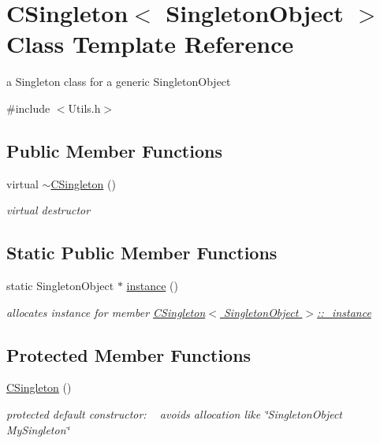 \hypertarget{classCSingleton}{}\section{C\+Singleton$<$ Singleton\+Object $>$ Class Template Reference}
\label{classCSingleton}


a Singleton class for a generic Singleton\+Object  




{\ttfamily \#include $<$Utils.\+h$>$}

\subsection*{Public Member Functions}
\begin{DoxyCompactItemize}
\item 
virtual \hyperlink{classCSingleton_ad790e6c170b3e2da7fbb10873eeb882e}{$\sim$\+C\+Singleton} ()
\begin{DoxyCompactList}\small\item\em virtual destructor \end{DoxyCompactList}\end{DoxyCompactItemize}
\subsection*{Static Public Member Functions}
\begin{DoxyCompactItemize}
\item 
static Singleton\+Object $\ast$ \hyperlink{classCSingleton_a58f5ac3aaaea8079a373350594726bdf}{instance} ()
\begin{DoxyCompactList}\small\item\em allocates instance for member \hyperlink{classCSingleton_a690e0816be5d469e60d074cf8c5d139c}{C\+Singleton$<$ Singleton\+Object $>$\+::\+\_\+instance} \end{DoxyCompactList}\end{DoxyCompactItemize}
\subsection*{Protected Member Functions}
\begin{DoxyCompactItemize}
\item 
\hyperlink{classCSingleton_aa03a7284f8092927696c3a94ef87cf31}{C\+Singleton} ()
\begin{DoxyCompactList}\small\item\em protected default constructor\+: ~\newline
 avoids allocation like \char`\"{}\+Singleton\+Object My\+Singleton\char`\"{} \end{DoxyCompactList}\end{DoxyCompactItemize}
